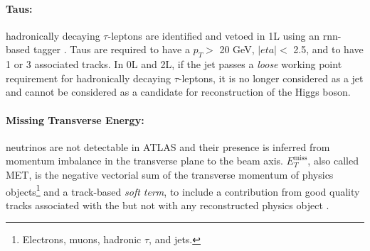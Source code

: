 \paragraph{Taus:} hadronically decaying $\tau$-leptons are identified and vetoed in 1L using an \gls{rnn}-based tagger \cite{ATL-PHYS-PUB-2019-033}. Taus are required to have a $p_T >$ 20 GeV, $|eta| <$ 2.5, and to have 1 or 3 associated tracks. In 0L and 2L, if the jet passes a \textit{loose} working point requirement for hadronically decaying $\tau$-leptons, it is no longer considered as a jet and cannot be considered as a candidate for reconstruction of the Higgs boson. %

\paragraph{Missing Transverse Energy:} neutrinos are not detectable in ATLAS and their presence is inferred from momentum imbalance in the transverse plane to the beam axis. $E_T^{\textrm{miss}}$, also called MET, is the negative vectorial sum of the transverse momentum of physics objects\footnote{Electrons, muons, hadronic $\tau$, and jets.} and a track-based \textit{soft term}, to include a contribution from good quality tracks associated with the  but not with any reconstructed physics object \cite{ATLASmetReco}. %

